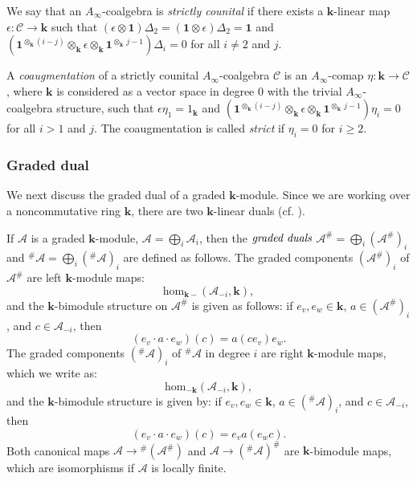 \documentclass{gtpart}
\renewcommand{\k}{\mathbf{k}}
\newcommand{\A}{\mathscr{A}}
\renewcommand{\C}{\mathscr{C}}
\newcommand{\id}{\mathbf{1}}
\begin{document}
We say that an $A_\infty$-coalgebra is \emph{strictly counital} if there exists a $\k$-linear map
$\epsilon\colon \C \to \k$ such that $(\epsilon \otimes \id) \Delta_2 = (\id
\otimes \epsilon) \Delta_2 = \id$ and $(\id^{\otimes_\k (i-j)} \otimes_\k \epsilon \otimes_\k
\id^{\otimes_\k\, j-1}) \Delta_i =0$ for all $i \neq 2$ and $j$. 


A \emph{coaugmentation} of a strictly counital $A_\infty$-coalgebra $\C$ is an $A_\infty$-comap $\eta \colon\k \to
\C$, where $\k$ is considered as a vector space in degree 0 with the trivial
$A_\infty$-coalgebra structure, such that $\epsilon \eta_1 = 1_\k$ and 
$(\id^{\otimes_\k (i-j)} \otimes_\k \epsilon \otimes_\k \id^{\otimes_\k\, j-1}) \eta_i =0$ for all
$i>1$ and $j$. The coaugmentation is called \emph{strict} if $\eta_i=0$ for $i \geq 2$. 

\subsubsection{Graded dual}\label{ssec:gradeddual}
We next discuss the graded dual of a graded $\k$-module. Since we are working over a noncommutative
ring $\k$, there are two $\k$-linear duals (cf. \cite{bgs}). 

If $\A$ is a graded $\k$-module, $\A=\bigoplus_{i}\A_{i}$, then the $\emph{graded duals}$
$\A^{\#}=\bigoplus_{i}(\A^{\#})_{i}$ and $^{\#}\!\A =\bigoplus_{i}(^{\#}\!\A)_{i}$ are defined as
follows. The graded components $(\A^{\#})_{i}$ of $\A^{\#}$ are left $\k$-module maps:
\[ 
\mathrm{hom}_{\k-}(\A_{-i},\k),
\] 
and the $\k$-bimodule structure on $\A^{\#}$ is given as follows: if $e_v,e_w\in\k$, $a\in(\A^{\#})_{i}$, and $c\in \A_{-i}$, then
\begin{equation} \label{leftkbimodule} 
(e_v \cdot a \cdot e_w) (c) = a(ce_v ) e_w. 
\end{equation}
The graded components $(^{\#}\!\A)_{i}$ of $^\#\!\A$ in degree $i$ are right $\k$-module maps,
which we write as:
\[ 
\mathrm{hom}_{-\k}(\A_{-i},\k),
\] 
and the $\k$-bimodule structure is given by: 
if $e_v,e_w\in\k$, $a\in(^{\#}\!\A)_{i}$, and $c\in \A_{-i}$, then
\begin{equation} \label{rightkbimodule}
(e_v \cdot a \cdot e_w) (c) = e_v a(e_w c). 
\end{equation}
Both canonical maps $\A \to \!^\#(\A^\#)$ and $\A \to (^\#\!\A)^\#$ are $\k$-bimodule maps, which are isomorphisms if $\A$ is locally finite.
\end{document}

